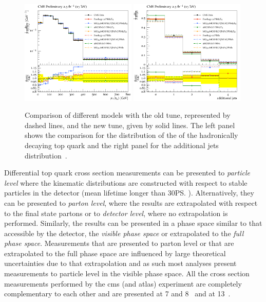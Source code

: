 \begin{figure}[htpb]
	\centering
	\includegraphics[width=0.49\textwidth]{Figures/TuningEx3}
	\includegraphics[width=0.49\textwidth]{Figures/TuningEx2}
	\caption[Comparison of different \ttbar{} models with the old \CUETold{} tune, represented by dashed lines, and the new \CUET{} tune, given by solid lines. The left panel shows the comparison for the distribution of the \pt{} of the hadronically decaying top quark and the right panel for the additional jets distribution.]{ Comparison of different \ttbar{} models with the old \CUETold{} tune, represented by dashed lines, and the new \CUET{} tune, given by solid lines. The left panel shows the comparison for the distribution of the \pt{} of the hadronically decaying top quark and the right panel for the additional jets distribution~\cite{Gen:CUETP8M2T4}. }
	\label{fig:8TeVTuning}
\end{figure}

Differential top quark cross section measurements can be presented to \textit{particle level} where the kinematic distributions are constructed with respect to stable particles in the detector (mean lifetime longer than 30\ps{}).
Alternatively, they can be presented to \textit{parton level}, where the results are extrapolated with respect to the final state partons or to \textit{detector level}, where no extrapolation is performed.
Similarly, the results can be presented in a phase space similar to that accessible by the detector, the \textit{visible phase space} or extrapolated to the \textit{full phase space}.
Measurements that are presented to parton level or that are extrapolated to the full phase space are influenced by large theoretical uncertainties due to that extrapolation and as such most analyses present measurements to particle level in the visible phase space.
All the \ttbar{} cross section measurements performed by the \acrshort{cms} (and \acrshort{atlas}) experiment are completely complementary to each other and are presented at 7 and 8\TeV{}~\cite{TOP11013,TOP12028,TOP14012,TOP14013} and at 13\TeV~\cite{TOP15013,TOP16007,TOP16008,TOP16010,TOP17002}.

